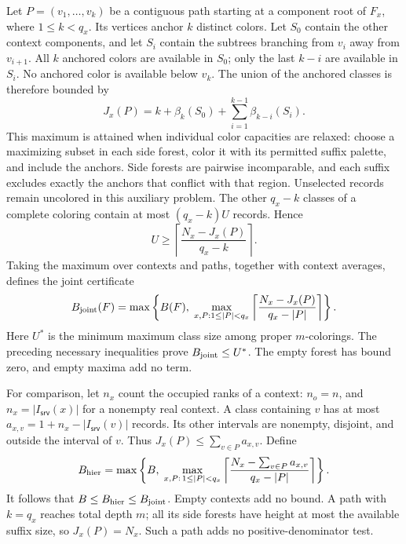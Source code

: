 Let $P=(v_1,\ldots,v_k)$ be a contiguous path starting at a component
root of $F_x$, where $1\le k<q_x$. Its vertices anchor $k$ distinct
colors. Let $S_0$ contain the other context components, and let $S_i$
contain the subtrees branching from $v_i$ away from $v_{i+1}$.
All $k$ anchored colors are available in $S_0$; only the last $k-i$
are available in $S_i$. No anchored color is available below $v_k$.
The union of the anchored classes is therefore bounded by
\begin{equation}
 J_x(P)=k+\beta_k(S_0)+\sum_{i=1}^{k-1}\beta_{k-i}(S_i).
 \label{eq:supp-joint-union}
\end{equation}
This maximum is attained when individual color capacities are relaxed:
choose a maximizing subset in each side forest, color it with its
permitted suffix palette, and include the anchors. Side forests are
pairwise incomparable, and each suffix excludes exactly the anchors
that conflict with that region. Unselected records remain uncolored
in this auxiliary problem. The other $q_x-k$ classes of a complete
coloring contain at most $(q_x-k)U$ records. Hence
\begin{equation}
 U\ge\left\lceil\frac{N_x-J_x(P)}{q_x-k}\right\rceil.
 \label{eq:supp-joint-ratio}
\end{equation}
Taking the maximum over contexts and paths, together with context
averages, defines the joint certificate
\begin{equation}
 B_{\rm joint}(F)=\max\left\{B(F),\;
 \max_{x,P:1\le |P|<q_x}
 \left\lceil\frac{N_x-J_x(P)}{q_x-|P|}\right\rceil\right\}.
 \label{eq:supp-joint-definition}
\end{equation}
Here $U^*$ is the minimum maximum class size among proper $m$-colorings.
The preceding necessary inequalities prove $B_{\rm joint}\le U^*$.
The empty forest has bound zero, and empty maxima add no term.

For comparison, let $n_x$ count the occupied ranks of a context:
$n_o=n$, and $n_x=|I_{\mathsf{srv}}(x)|$ for a nonempty real context.
A class containing $v$ has at most
$a_{x,v}=1+n_x-|I_{\mathsf{srv}}(v)|$ records. Its other intervals
are nonempty, disjoint, and outside the interval of $v$.
Thus $J_x(P)\le\sum_{v\in P}a_{x,v}$. Define
\begin{equation}
 B_{\rm hier}=\max\left\{B,\;
 \max_{x,P:\,1\le |P|<q_x}
 \left\lceil\frac{N_x-\sum_{v\in P}a_{x,v}}{q_x-|P|}\right\rceil
 \right\}.
 \label{eq:supp-individual-hierarchy}
\end{equation}
It follows that $B\le B_{\rm hier}\le B_{\rm joint}$. Empty contexts
add no bound. A path with $k=q_x$ reaches total depth $m$; all its
side forests have height at most the available suffix size, so
$J_x(P)=N_x$. Such a path adds no positive-denominator test.

